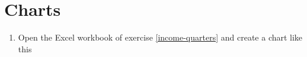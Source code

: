 
\section{Charts}
\begin{enumerate}[leftmargin=*,resume]
\item Open the Excel workbook of exercise \ref{income-quarters} and create a chart like this



\end{enumerate}